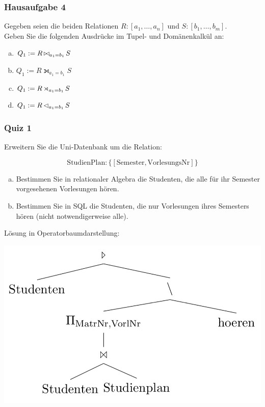 \begin{frame}
	\frametitle{Hausaufgabe 4}
	\vspace{0.5cm}

	Gegeben seien die beiden Relationen \( R: {[a_1, \hdots, a_n]} \) und \( S: {[b_1, \hdots, b_m]} \). \\
	Geben Sie die folgenden Ausdrücke im Tupel- und Domänenkalkül an:
	\begin{enumerate}[a)]
		\item \( Q_1 := R \operatorname*{\bowtie}_{a_1 = b_1} S \)
		\item \( Q_1 := R \leftouterjoin_{a_1 = b_1} S \)
		\item \( Q_1 := R \operatorname*{\rtimes}_{a_1 = b_1} S \)
		\item \( Q_1 := R \operatorname*{\lhd}_{a_1 = b_1} S \)
	\end{enumerate}
\end{frame}

\begin{frame}[fragile]
	\frametitle{Quiz 1}
	\vspace{0.5cm}

	\begin{multicols}{2}
		Erweitern Sie die Uni-Datenbank um die Relation:

		\[ \text{StudienPlan}: \{ [\text{Semester}, \text{VorlesungsNr}] \} \]

		\begin{enumerate}[a)]
			\item<1-> Bestimmen Sie in relationaler Algebra die Studenten, die alle für ihr Semester
				vorgesehenen Vorlesungen hören.
			\item<3-> Bestimmen Sie in SQL die Studenten,
				die nur Vorlesungen ihres Semesters hören (nicht notwendigerweise alle).
		\end{enumerate}
		\vfill\columnbreak
		\pause

		Lösung in Operatorbaumdarstellung:
		\begin{center}
			\includegraphics[height=.3\paperheight]{./quiz1.png}
		\end{center}
	\end{multicols}

\end{frame}

